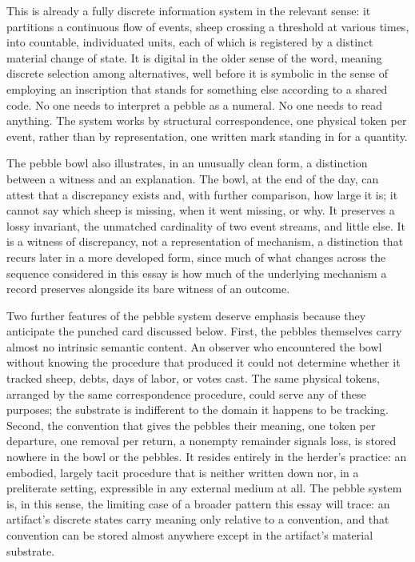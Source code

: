 \documentclass[11pt]{article}
\begin{document}
This is already a fully discrete information system in the relevant sense: it partitions a continuous flow of events, sheep crossing a threshold at various times, into countable, individuated units, each of which is registered by a distinct material change of state. It is digital in the older sense of the word, meaning discrete selection among alternatives, well before it is symbolic in the sense of employing an inscription that stands for something else according to a shared code. No one needs to interpret a pebble as a numeral. No one needs to read anything. The system works by structural correspondence, one physical token per event, rather than by representation, one written mark standing in for a quantity.

The pebble bowl also illustrates, in an unusually clean form, a distinction between a witness and an explanation. The bowl, at the end of the day, can attest that a discrepancy exists and, with further comparison, how large it is; it cannot say which sheep is missing, when it went missing, or why. It preserves a lossy invariant, the unmatched cardinality of two event streams, and little else. It is a witness of discrepancy, not a representation of mechanism, a distinction that recurs later in a more developed form, since much of what changes across the sequence considered in this essay is how much of the underlying mechanism a record preserves alongside its bare witness of an outcome.

Two further features of the pebble system deserve emphasis because they anticipate the punched card discussed below. First, the pebbles themselves carry almost no intrinsic semantic content. An observer who encountered the bowl without knowing the procedure that produced it could not determine whether it tracked sheep, debts, days of labor, or votes cast. The same physical tokens, arranged by the same correspondence procedure, could serve any of these purposes; the substrate is indifferent to the domain it happens to be tracking. Second, the convention that gives the pebbles their meaning, one token per departure, one removal per return, a nonempty remainder signals loss, is stored nowhere in the bowl or the pebbles. It resides entirely in the herder's practice: an embodied, largely tacit procedure that is neither written down nor, in a preliterate setting, expressible in any external medium at all. The pebble system is, in this sense, the limiting case of a broader pattern this essay will trace: an artifact's discrete states carry meaning only relative to a convention, and that convention can be stored almost anywhere except in the artifact's material substrate.
\end{document}
